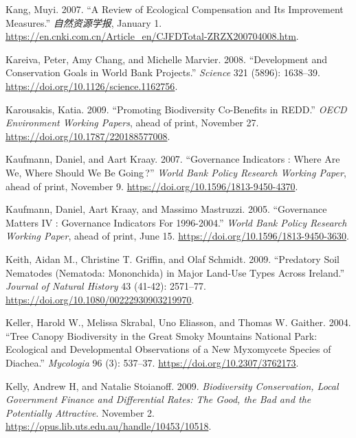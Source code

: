 \begin{CSLReferences}{1}{1}
Kang, Muyi. 2007. {``A Review of Ecological Compensation and Its
Improvement Measures.''} \emph{自然资源学报}, January 1.
\url{https://en.cnki.com.cn/Article_en/CJFDTotal-ZRZX200704008.htm}.

Kareiva, Peter, Amy Chang, and Michelle Marvier. 2008. {``Development
and Conservation Goals in World Bank Projects.''} \emph{Science} 321
(5896): 1638--39. \url{https://doi.org/10.1126/science.1162756}.

Karousakis, Katia. 2009. {``Promoting Biodiversity Co-Benefits in
REDD.''} \emph{OECD Environment Working Papers}, ahead of print,
November 27. \url{https://doi.org/10.1787/220188577008}.

Kaufmann, Daniel, and Aart Kraay. 2007. {``Governance Indicators : Where
Are We, Where Should We Be Going\,?''} \emph{World Bank Policy Research
Working Paper}, ahead of print, November 9.
\url{https://doi.org/10.1596/1813-9450-4370}.

Kaufmann, Daniel, Aart Kraay, and Massimo Mastruzzi. 2005. {``Governance
Matters IV : Governance Indicators For 1996-2004.''} \emph{World Bank
Policy Research Working Paper}, ahead of print, June 15.
\url{https://doi.org/10.1596/1813-9450-3630}.

Keith, Aidan M., Christine T. Griffin, and Olaf Schmidt. 2009.
{``Predatory Soil Nematodes (Nematoda: Mononchida) in Major Land-Use
Types Across Ireland.''} \emph{Journal of Natural History} 43 (41-42):
2571--77. \url{https://doi.org/10.1080/00222930903219970}.

Keller, Harold W., Melissa Skrabal, Uno Eliasson, and Thomas W. Gaither.
2004. {``Tree Canopy Biodiversity in the Great Smoky Mountains National
Park: Ecological and Developmental Observations of a New Myxomycete
Species of Diachea.''} \emph{Mycologia} 96 (3): 537--37.
\url{https://doi.org/10.2307/3762173}.

Kelly, Andrew H, and Natalie Stoianoff. 2009. \emph{Biodiversity
Conservation, Local Government Finance and Differential Rates: The Good,
the Bad and the Potentially Attractive}. November 2.
\url{https://opus.lib.uts.edu.au/handle/10453/10518}.


\end{CSLReferences}
